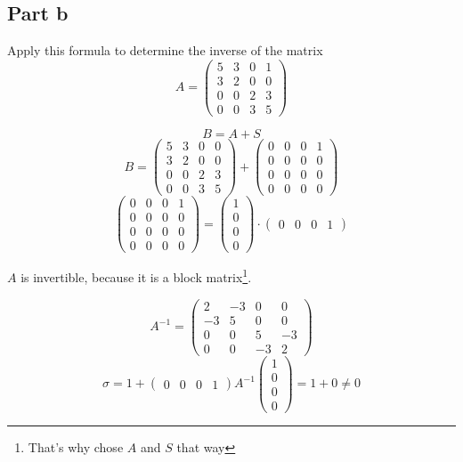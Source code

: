 \documentclass[a4paper]{article}
\theoremstyle{definition}
\begin{document}
\subsection{Part b}
\begin{ex}
  Apply this formula to determine the inverse of the matrix
  \[
    A = \begin{pmatrix}
      5 & 3 & 0 & 1 \\
      3 & 2 & 0 & 0 \\
      0 & 0 & 2 & 3 \\
      0 & 0 & 3 & 5
    \end{pmatrix}
  \]
\end{ex}

\[
  B = A + S
\] \[
  B = \begin{pmatrix} 5 & 3 & 0 & 0 \\ 3 & 2 & 0 & 0 \\ 0 & 0 & 2 & 3 \\ 0 & 0 & 3 & 5 \end{pmatrix}
  + \begin{pmatrix} 0 & 0 & 0 & 1 \\ 0 & 0 & 0 & 0 \\ 0 & 0 & 0 & 0 \\ 0 & 0 & 0 & 0 \end{pmatrix}
\] \[
  \begin{pmatrix} 0 & 0 & 0 & 1 \\ 0 & 0 & 0 & 0 \\ 0 & 0 & 0 & 0 \\ 0 & 0 & 0 & 0 \end{pmatrix}
    = \begin{pmatrix} 1 \\ 0 \\ 0 \\ 0 \end{pmatrix} \cdot \begin{pmatrix} 0 & 0 & 0 & 1 \end{pmatrix}
\]

$A$ is invertible, because it is a block matrix\footnote{That's why chose $A$ and $S$ that way}.

\[
  A^{-1} = \begin{pmatrix}
    2 & -3 & 0 & 0 \\
    -3 & 5 & 0 & 0 \\
    0 & 0 & 5 & -3 \\
    0 & 0 & -3 & 2
  \end{pmatrix}
\] \[
  \sigma = 1 + \begin{pmatrix} 0 & 0 & 0 & 1 \end{pmatrix} A^{-1} \begin{pmatrix} 1 \\ 0 \\ 0 \\ 0 \end{pmatrix} = 1 + 0 \neq 0
\]
\end{document}
